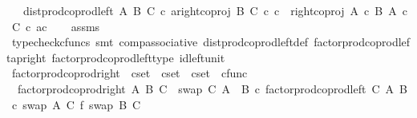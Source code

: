\begin{isabellebody}
\ \ \ {\isachardoublequoteopen}dist{\isacharunderscore}{\kern0pt}prod{\isacharunderscore}{\kern0pt}coprod{\isacharunderscore}{\kern0pt}left\ A\ B\ C\ {\isasymcirc}\isactrlsub c\ {\isasymlangle}a{\isacharcomma}{\kern0pt}right{\isacharunderscore}{\kern0pt}coproj\ B\ C\ {\isasymcirc}\isactrlsub c\ c{\isasymrangle}\ {\isacharequal}{\kern0pt}\ right{\isacharunderscore}{\kern0pt}coproj\ {\isacharparenleft}{\kern0pt}A\ {\isasymtimes}\isactrlsub c\ B{\isacharparenright}{\kern0pt}\ {\isacharparenleft}{\kern0pt}A\ {\isasymtimes}\isactrlsub c\ C{\isacharparenright}{\kern0pt}\ {\isasymcirc}\isactrlsub c\ {\isasymlangle}a{\isacharcomma}{\kern0pt}c{\isasymrangle}{\isachardoublequoteclose}\isanewline
%
\isadelimproof
\ \ %
\endisadelimproof
%
\isatagproof
{}\isamarkupfalse%
\ assms\ \isamarkupfalse%
\ {\isacharparenleft}{\kern0pt}typecheck{\isacharunderscore}{\kern0pt}cfuncs{\isacharcomma}{\kern0pt}\ smt\ comp{\isacharunderscore}{\kern0pt}associative{}\ dist{\isacharunderscore}{\kern0pt}prod{\isacharunderscore}{\kern0pt}coprod{\isacharunderscore}{\kern0pt}left{\isacharunderscore}{\kern0pt}def{}\ factor{\isacharunderscore}{\kern0pt}prod{\isacharunderscore}{\kern0pt}coprod{\isacharunderscore}{\kern0pt}left{\isacharunderscore}{\kern0pt}ap{\isacharunderscore}{\kern0pt}right\ factor{\isacharunderscore}{\kern0pt}prod{\isacharunderscore}{\kern0pt}coprod{\isacharunderscore}{\kern0pt}left{\isacharunderscore}{\kern0pt}type\ id{\isacharunderscore}{\kern0pt}left{\isacharunderscore}{\kern0pt}unit{}{\isacharparenright}{\kern0pt}%
\endisatagproof
{\isafoldproof}%
%
\isadelimproof
%
\endisadelimproof
%
\isadelimdocument
%
\endisadelimdocument
%
\isatagdocument
%
\isamarkuptrue%
%
\endisatagdocument
{\isafolddocument}%
%
\isadelimdocument
%
\endisadelimdocument
{}\isamarkupfalse%
\ factor{\isacharunderscore}{\kern0pt}prod{\isacharunderscore}{\kern0pt}coprod{\isacharunderscore}{\kern0pt}right\ {\isacharcolon}{\kern0pt}{\isacharcolon}{\kern0pt}\ {\isachardoublequoteopen}cset\ {\isasymRightarrow}\ cset\ {\isasymRightarrow}\ cset\ {\isasymRightarrow}\ cfunc{\isachardoublequoteclose}\ \isanewline
\ \ {\isachardoublequoteopen}factor{\isacharunderscore}{\kern0pt}prod{\isacharunderscore}{\kern0pt}coprod{\isacharunderscore}{\kern0pt}right\ A\ B\ C\ {\isacharequal}{\kern0pt}\ swap\ C\ {\isacharparenleft}{\kern0pt}A\ {\isasymCoprod}\ B{\isacharparenright}{\kern0pt}\ {\isasymcirc}\isactrlsub c\ factor{\isacharunderscore}{\kern0pt}prod{\isacharunderscore}{\kern0pt}coprod{\isacharunderscore}{\kern0pt}left\ C\ A\ B\ {\isasymcirc}\isactrlsub c\ {\isacharparenleft}{\kern0pt}swap\ A\ C\ {\isasymbowtie}\isactrlsub f\ swap\ B\ C{\isacharparenright}{\kern0pt}{\isachardoublequoteclose}\isanewline

\end{isabellebody}
